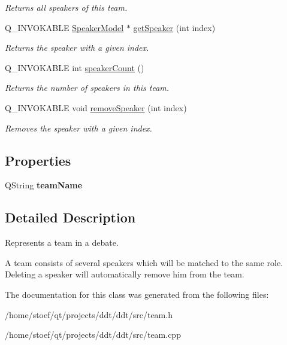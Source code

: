 \begin{DoxyCompactItemize}
\begin{DoxyCompactList}\small\item\em Returns all speakers of this team. \end{DoxyCompactList}\item 
\hypertarget{classTeam_aa64df580e27d1e27b3ced935fa9659f9}{Q\-\_\-\-I\-N\-V\-O\-K\-A\-B\-L\-E \hyperlink{classSpeakerModel}{Speaker\-Model} $\ast$ \hyperlink{classTeam_aa64df580e27d1e27b3ced935fa9659f9}{get\-Speaker} (int index)}\label{classTeam_aa64df580e27d1e27b3ced935fa9659f9}

\begin{DoxyCompactList}\small\item\em Returns the speaker with a given index. \end{DoxyCompactList}\item 
\hypertarget{classTeam_a88ff24cc77f3c1695dbbf26c6c51012c}{Q\-\_\-\-I\-N\-V\-O\-K\-A\-B\-L\-E int \hyperlink{classTeam_a88ff24cc77f3c1695dbbf26c6c51012c}{speaker\-Count} ()}\label{classTeam_a88ff24cc77f3c1695dbbf26c6c51012c}

\begin{DoxyCompactList}\small\item\em Returns the number of speakers in this team. \end{DoxyCompactList}\item 
\hypertarget{classTeam_abdd95ad8dae4c5fa9b2bfdf199c1fa2f}{Q\-\_\-\-I\-N\-V\-O\-K\-A\-B\-L\-E void \hyperlink{classTeam_abdd95ad8dae4c5fa9b2bfdf199c1fa2f}{remove\-Speaker} (int index)}\label{classTeam_abdd95ad8dae4c5fa9b2bfdf199c1fa2f}

\begin{DoxyCompactList}\small\item\em Removes the speaker with a given index. \end{DoxyCompactList}\end{DoxyCompactItemize}
\subsection*{Properties}
\begin{DoxyCompactItemize}
\item 
\hypertarget{classTeam_a9c0ae7e7f136221e0557aeec458b3a66}{Q\-String {\bfseries team\-Name}}\label{classTeam_a9c0ae7e7f136221e0557aeec458b3a66}

\end{DoxyCompactItemize}


\subsection{Detailed Description}
Represents a team in a debate. 

A team consists of several speakers which will be matched to the same role. Deleting a speaker will automatically remove him from the team. 

The documentation for this class was generated from the following files\-:\begin{DoxyCompactItemize}
\item 
/home/stoef/qt/projects/ddt/ddt/src/team.\-h\item 
/home/stoef/qt/projects/ddt/ddt/src/team.\-cpp\end{DoxyCompactItemize}
